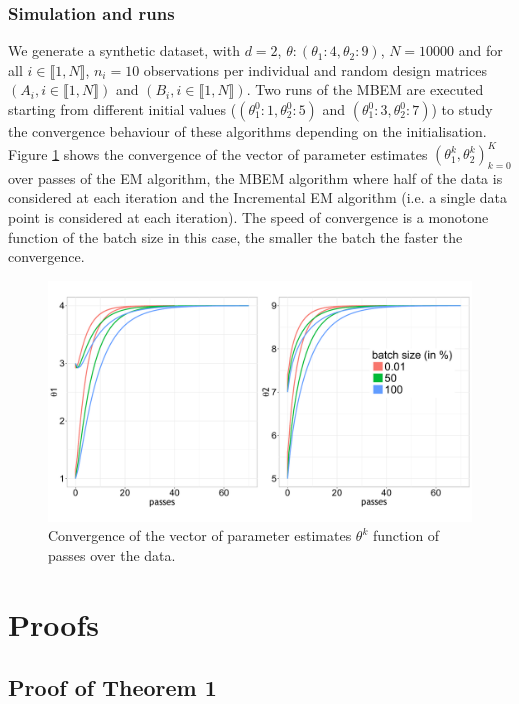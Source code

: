 \documentclass[11pt]{article}
\theoremstyle{plain}
\newcommand{\inter}{\llbracket1,N\rrbracket}
\theoremstyle{plain}
\theoremstyle{definition}
\begin{document}
\subsubsection{Simulation and runs}
We generate a synthetic dataset, with $d = 2$, $\theta: (\theta_1:4,\theta_2:9)$, $N=10000$ and for all $i \in \inter$, $n_i = 10$ observations per individual and random design matrices $(A_i, i \in \inter)$ and $(B_i, i \in \inter)$. Two runs of the MBEM are executed starting from different initial values ($(\theta_1^0:1,\theta_2^0:5)$ and $(\theta_1^0:3,\theta_2^0:7)$) to study the convergence behaviour of these algorithms depending on the initialisation.
Figure \ref{iem_glm} shows the convergence of the vector of parameter estimates $(\theta_1^k,\theta_2^k)_{k=0}^{K}$ over passes of the EM algorithm, the MBEM algorithm where half of the data is considered at each iteration and the Incremental EM algorithm (i.e. a single data point is considered at each iteration). The speed of convergence is a monotone function of the batch size in this case, the smaller the batch the faster the convergence.
\begin{figure}
\begin{center}
\includegraphics[scale = 0.35]{pics/iems.pdf}
\caption{Convergence of the vector of parameter estimates $\theta^k$ function of passes over the data.}
\label{iem_glm}
\end{center}
\end{figure}


\clearpage


\section{Proofs}\label{sec:proofs}

\subsection{Proof of Theorem 1}\label{proofs:IEM}
\end{document}
